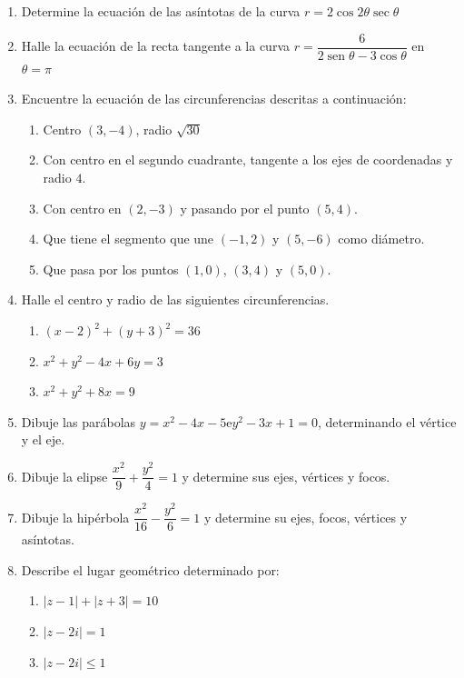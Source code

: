 \begin{enumerate}
\item
Determine la ecuación de las asíntotas de la curva $r=2\cos 2\theta\sec\theta$


\item
Halle la ecuación de la recta tangente a la curva $r=\dfrac{6}{2\operatorname{sen}\theta -3\cos\theta}$ en $\theta=\pi$

\newpage
\item Encuentre la ecuación de las circunferencias
descritas a continuación:
\begin{enumerate}
\item Centro $(3,-4)$, radio $\sqrt{30}$
\item Con centro en el segundo cuadrante, tangente a los
ejes de coordenadas y radio $4$.
\item Con centro en $(2,-3)$ y pasando por el punto
$(5,4)$.
\item Que tiene el segmento que une $(-1,2)$ y $(5,-6)$
como diámetro.
\item Que pasa por los puntos $(1,0)$, $(3,4)$ y $(5,0)$.
\end{enumerate}

\item Halle el centro y radio de las siguientes
circunferencias.
\begin{enumerate}
\item $(x-2)^2+(y+3)^2=36$
\item $x^2+y^2-4x+6y=3$
\item $x^2+y^2+8x=9$
\end{enumerate}


\item Dibuje las parábolas $y=x^2-4x-5$\quad e\quad  $y^2-3x+1=0$, determinando el vértice y el eje.

\item
Dibuje la elipse $\dfrac{x^2}{9}+\dfrac{y^2}{4}=1$ y determine sus ejes, vértices y focos.

\item
Dibuje la hipérbola $\dfrac{x^2}{16}-\dfrac{y^2}{6}=1$
y determine su ejes, focos, vértices y asíntotas.


\item
Describe el lugar geométrico determinado por:
\begin{enumerate}
\item %
$\left | z-1 \right |+\left | z+3 \right |= 10$       \item %
$\left | z-2i \right |= 1$
\item %
$\left | z-2i \right |\leqslant 1 $       
\end{enumerate}






\end{enumerate}
